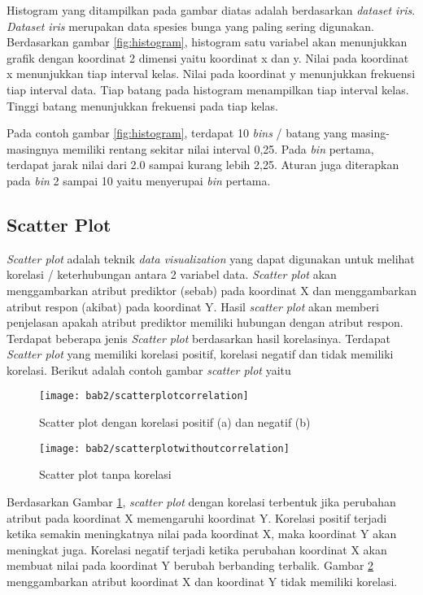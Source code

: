 	
 Histogram yang ditampilkan pada gambar diatas adalah berdasarkan \textit{dataset iris}. \textit{Dataset iris} merupakan data spesies bunga yang paling sering digunakan. Berdasarkan gambar \ref{fig:histogram}, histogram satu variabel akan menunjukkan grafik dengan koordinat 2 dimensi yaitu koordinat x dan y. Nilai pada koordinat x menunjukkan tiap interval kelas. Nilai pada koordinat y menunjukkan frekuensi tiap interval data. Tiap batang pada histogram menampilkan tiap interval kelas. Tinggi batang menunjukkan frekuensi pada tiap kelas.
		
 Pada contoh gambar \ref{fig:histogram}, terdapat 10 \textit{bins} / batang yang masing-masingnya memiliki rentang sekitar nilai interval 0,25. Pada \textit{bin} pertama, terdapat jarak nilai dari 2.0 sampai kurang lebih 2,25. Aturan juga diterapkan pada \textit{bin} 2 sampai 10 yaitu menyerupai  \textit{bin} pertama. \\ 
 
 
\subsection{Scatter Plot} 
 \textit{Scatter plot} adalah teknik \textit{data visualization} yang dapat digunakan untuk melihat korelasi / keterhubungan antara 2 variabel data. \textit{Scatter plot} akan menggambarkan atribut prediktor (sebab) pada koordinat X dan menggambarkan atribut respon (akibat) pada koordinat Y. Hasil \textit{scatter plot} akan memberi penjelasan apakah atribut prediktor memiliki hubungan dengan atribut respon. Terdapat beberapa jenis \textit{Scatter plot} berdasarkan hasil korelasinya. Terdapat \textit{Scatter plot} yang memiliki korelasi positif, korelasi negatif dan tidak memiliki korelasi. Berikut adalah contoh gambar \textit{scatter plot} yaitu
 
\pagebreak
		\begin{figure}[h!]
		\centering  
		\texttt{[image: bab2/scatterplotcorrelation]}   
		\caption{Scatter plot dengan korelasi positif (a) dan negatif (b)}
		\label{fig:scatterplotcorrelation} 
	\end{figure} 
	
	\begin{figure}[h!]
		\centering  
		\texttt{[image: bab2/scatterplotwithoutcorrelation]}   
		\caption{Scatter plot tanpa korelasi}
		\label{fig:scatterplotwithoutcorrelation} 
	\end{figure} 
	
Berdasarkan Gambar \ref{fig:scatterplotcorrelation}, \textit{scatter plot} dengan korelasi terbentuk jika perubahan atribut pada koordinat X memengaruhi koordinat Y. Korelasi positif terjadi ketika semakin meningkatnya nilai pada koordinat X, maka koordinat Y akan meningkat juga. Korelasi negatif terjadi ketika perubahan koordinat X akan membuat nilai pada koordinat Y berubah berbanding terbalik. Gambar \ref{fig:scatterplotwithoutcorrelation} menggambarkan atribut koordinat X dan koordinat Y tidak memiliki korelasi.  

